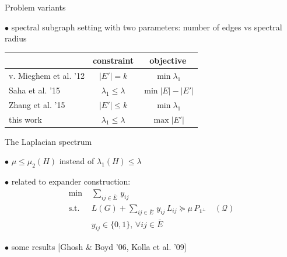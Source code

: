 \documentclass[14pt]{beamer}
\begin{document}
\begin{frame}{Problem variants}
\begin{fullpageitemize}
\item $\bullet$ spectral subgraph setting with two parameters: number of edges vs spectral radius
\item \begin{table}
\begin{tabular}{ l|c|c } 
& constraint & objective \\ 
\hline
v. Mieghem et al. '12 & $|E'| = k$ & $\min \lambda_1$ \\ 
Saha et al. '15 & $\lambda_1 \leq \lambda$ & $\min |E| - |E'|$ \\
Zhang et al. '15 & $|E'| \leq k$ & $\min \lambda_1$ \\ 
this work & $\lambda_1 \leq \lambda$ & $\max |E'|$
\end{tabular}
\end{table}
\end{fullpageitemize}
\end{frame}

\begin{frame}{The Laplacian spectrum}
\begin{fullpageitemize}
\item $\bullet$ $\mu \leq \mu_2(H)$ instead of $\lambda_1(H) \leq \lambda$
\item $\bullet$ related to expander construction: \begin{align*}
\min \, & \, \sum_{ij \in \bar{E}} \, y_{ij} \\
\text{s.t.} \, & \, L(G) + \sum_{ij \in \bar{E}} \, y_{ij} \, L_{ij} \succeq \mu \, P_{\mathbf{1}^{\perp}} \quad (\mathcal{Q}) \\
& \, y_{ij} \in \{0,1\},\, \forall ij \in \bar{E}
\end{align*}
\item $\bullet$ some results \small{[Ghosh \& Boyd '06, Kolla et al. '09]}
\end{fullpageitemize}
\end{frame}

\end{document}
